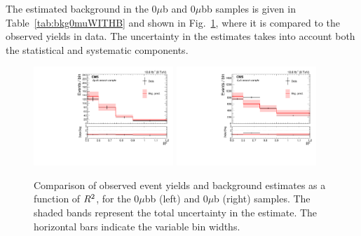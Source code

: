 The estimated background in the 0$\mu$b and 0$\mu$bb
samples is given in Table~\ref{tab:bkg0muWITHB} and shown in Fig.~\ref{fig:0muttbar}, where it is compared to
the observed yields in data. The uncertainty in the
estimates takes into account both the statistical and systematic
components.%
\begin{figure}
   \includegraphics[width=0.47\textwidth]{BtagPlots/Bkg_0mu2TbEXC_CP.pdf}
   \includegraphics[width=0.47\textwidth]{BtagPlots/Bkg_0mu1TbEXC_CP.pdf}
 \caption{Comparison of observed event yields and background
   estimates as a function of $R^2$, for the
   $0\mu$bb (left) and $0\mu$b (right) samples. The shaded bands
   represent the total uncertainty in the estimate. The horizontal bars indicate
the variable bin widths.\label{fig:0muttbar}}
\end{figure}
\begin{table}
\centering
\end{table}
